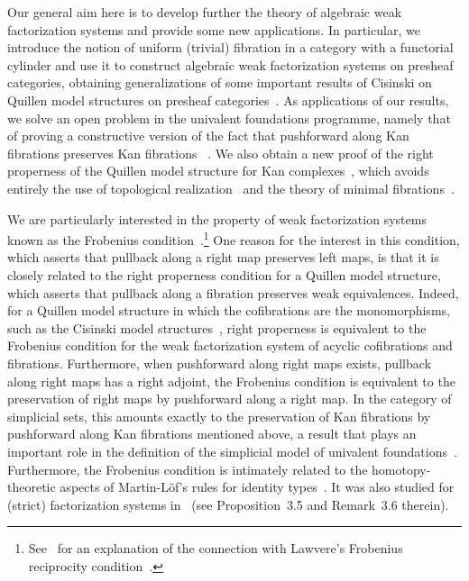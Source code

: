\documentclass[reqno,10pt,a4paper,oneside,draft]{amsart}
\begin{document}
Our general aim here is to develop further the theory of algebraic weak factorization systems and provide some new applications.
In particular, we introduce the notion of uniform (trivial) fibration in a category with a functorial cylinder and use it to construct algebraic weak factorization systems on presheaf categories, obtaining generalizations of some important results of Cisinski on Quillen model structures on presheaf categories~\cite{cisinski-asterisque}.
As applications of our results, we solve an open problem in the univalent foundations programme, namely that of proving a constructive version of the fact that pushforward along Kan fibrations preserves Kan fibrations ~\cite{coquand-non-constructivity-kan,voevodsky-simplicial-model}.
We also obtain a new proof of the right properness of the Quillen model structure for Kan complexes~\cite{quillen-homotopical}, which avoids entirely the use of topological realization~\cite{hovey-model-categories} and the theory of minimal fibrations~\cite{joyal-tierney:simplicial-homotopy-theory}.

We are particularly interested in the property of weak factorization systems known as the Frobenius condition~\cite[Definition~3.2.1]{garner:types-omega-groupoids}.\footnote{See~\cite{clementino:frobenius} for an explanation of the connection with Lawvere's Frobenius reciprocity condition~\cite{lawvere-equality}.} One reason for the interest in this condition, which asserts that pullback along a right map preserves left maps, is that it is closely related to the right properness condition for a Quillen model structure, which asserts that pullback along a fibration preserves weak equivalences.
Indeed, for a Quillen model structure in which the cofibrations are the monomorphisms, such as the Cisinski model structures~\cite{cisinski-asterisque}, right properness is equivalent to the Frobenius condition for the weak factorization system of acyclic cofibrations and fibrations.
Furthermore, when pushforward along right maps exists, \ie pullback along right maps has a right adjoint, the Frobenius condition is equivalent to the preservation of right maps by pushforward along a right map.
In the category of simplicial sets, this amounts exactly to the preservation of Kan fibrations by pushforward along Kan fibrations mentioned above, a result that plays an important role in the definition of the simplicial model of univalent foundations~\cite[Lemma~2.3.1]{voevodsky-simplicial-model}.
Furthermore, the Frobenius condition is intimately related to the homotopy-theoretic aspects of Martin-L\"of's rules for identity types~\cite{gambino-garner:idtypewfs}.
It was also studied for (strict) factorization systems in~\cite{rosicky-tholem-factorization} (see Proposition~3.5 and Remark~3.6 therein).
\end{document}
